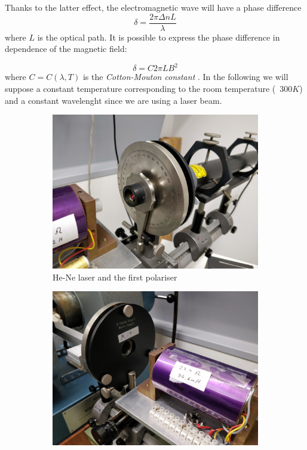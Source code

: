 \documentclass[11pt,a4paper]{article}
\begin{document}
Thanks to the latter effect, the electromagnetic wave will have a phase difference
\begin{equation} 
\delta=\frac{2\pi \Delta n L}{\lambda}
\end{equation}
where $L$ is the optical path. It is possible to express the phase difference in dependence of the magnetic field:

\begin{equation}\label{eq:CME}
\delta=C2\pi L B^2
\end{equation}
where $C=C(\lambda,T)$ is the \emph{Cotton-Mouton constant} \cite{wilson1997simple}. In the following we will suppose a constant temperature corresponding to the room temperature (~$300K$) and a constant wavelenght since we are using a laser beam.

\begin{figure}[H]
\centering
\begin{subfigure}[b]{0.45\textwidth}
\includegraphics[width=\textwidth]{laser_polariser}
\caption{He-Ne laser and the first polariser}
\label{fig:exp_setup_laser}
\end{subfigure}
\begin{subfigure}[b]{0.45\textwidth}
\includegraphics[width=\textwidth]{Faraday_compensator_quarter_plate}

\end{subfigure}
\end{figure}
\end{document}
